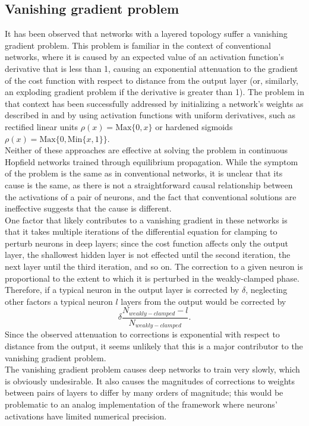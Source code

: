 \documentclass{article}
\newcommand{\npar}{\\\indent}
\begin{document}
\subsection{Vanishing gradient problem}

It has been observed that networks with a layered topology suffer a vanishing gradient problem. This problem is familiar in the context of conventional networks, where it is caused by an expected value of an activation function's derivative that is less than 1, causing an exponential attenuation to the gradient of the cost function with respect to distance from the output layer (or, similarly, an exploding gradient problem if the derivative is greater than 1). The problem in that context has been successfully addressed by initializing a network's weights as described in \cite{glorot2010} and by using activation functions with uniform derivatives, such as rectified linear units $\rho(x)=\text{Max}\{0, x\}$ or hardened sigmoids $\rho(x)=\text{Max}\{0, \text{Min}\{x, 1\}\}$.
\npar
Neither of these approaches are effective at solving the problem in continuous Hopfield networks trained through equilibrium propagation. While the symptom of the problem is the same as in conventional networks, it is unclear that its cause is the same, as there is not a straightforward causal relationship between the activations of a pair of neurons, and the fact that conventional solutions are ineffective suggests that the cause is different.
\npar
One factor that likely contributes to a vanishing gradient in these networks is that it takes multiple iterations of the differential equation for clamping to perturb neurons in deep layers; since the cost function affects only the output layer, the shallowest hidden layer is not effected until the second iteration, the next layer until the third iteration, and so on. The correction to a given neuron is proportional to the extent to which it is perturbed in the weakly-clamped phase. Therefore, if a typical neuron in the output layer is corrected by $\delta$, neglecting other factors a typical neuron $l$ layers from the output would be corrected by \begin{equation}\delta\frac{N_{weakly-clamped}-l}{N_{weakly-clamped}}.\end{equation} Since the observed attenuation to corrections is exponential with respect to distance from the output, it seems unlikely that this is a major contributor to the vanishing gradient problem.
\npar
The vanishing gradient problem causes deep networks to train very slowly, which is obviously undesirable. It also causes the magnitudes of corrections to weights between pairs of layers to differ by many orders of magnitude; this would be problematic to an analog implementation of the framework where neurons' activations have limited numerical precision.
\end{document}
